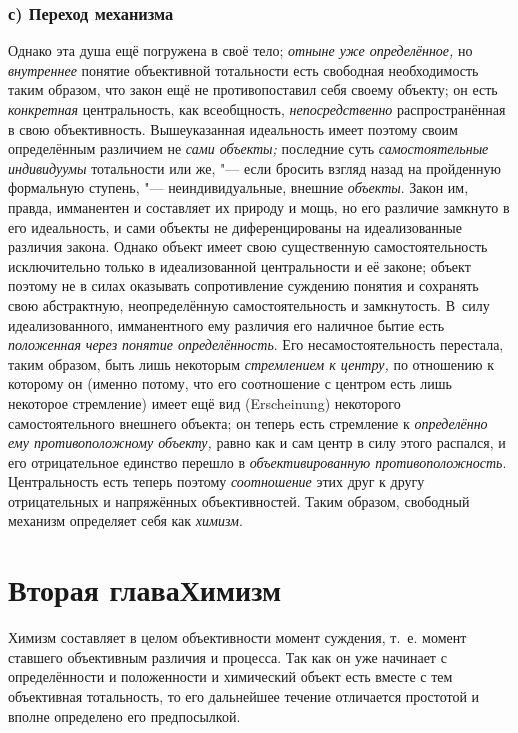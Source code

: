 \subsection[с) Переход механизма]{с) Переход механизма}

Однако эта душа ещё погружена в своё тело;
{\em отныне уже определённое,}
но {\em внутреннее}
понятие объективной тотальности есть свободная необходимость
таким образом, что закон ещё не противопоставил себя своему объекту; он
есть {\em конкретная}
центральность, как всеобщность,
{\em непосредственно}
распространённая в свою объективность. Вышеуказанная
идеальность имеет поэтому своим определённым различием не
{\em сами объекты;}
последние суть
{\em самостоятельные индивидуумы}
тотальности или же, "--- если бросить взгляд
назад на пройденную формальную ступень, "--- неиндивидуальные,
внешние {\em объекты}.
Закон им, правда, имманентен и составляет их природу и мощь,
но его различие замкнуто в его идеальность, и сами объекты не
диференцированы на идеализованные различия закона. Однако объект имеет свою
существенную самостоятельность исключительно только в идеализованной
центральности и её законе; объект поэтому не в силах оказывать
сопротивление суждению понятия и сохранять свою абстрактную, неопределённую
самостоятельность и замкнутость. В~силу идеализованного, имманентного ему
различия его наличное бытие есть
{\em положенная}
{\em через понятие определённость}.
Его несамостоятельность перестала, таким образом, быть лишь
некоторым {\em стремлением к центру,}
по отношению к которому он (именно потому, что его
соотношение с центром есть лишь некоторое стремление) имеет ещё вид
(Erscheinung) некоторого самостоятельного внешнего объекта;
он теперь есть стремление к
{\em определённо ему противоположному
объекту,} равно как и сам центр в силу этого распался, и его
отрицательное единство перешло в
{\em объективированную
противоположность}. Центральность есть теперь
поэтому
{\em соотношение} этих
друг к другу отрицательных и напряжённых объективностей. Таким образом,
свободный механизм определяет себя как
{\em химизм}.

\chapter[Вторая глава Химизм]{Вторая глава\newline Химизм}

Химизм составляет в целом объективности момент суждения, т.~е.
момент ставшего объективным различия и процесса. Так как он уже начинает с
определённости и положенности и химический объект есть вместе с тем
объективная тотальность, то его дальнейшее течение отличается простотой и
вполне определено его предпосылкой.


